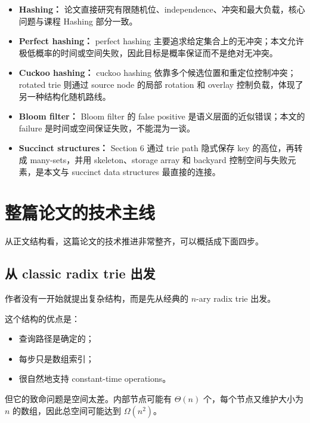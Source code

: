 \documentclass[12pt]{article}
\begin{document}
\begin{itemize}
\item \textbf{Hashing：} 论文直接研究有限随机位、independence、冲突和最大负载，核心问题与课程 Hashing 部分一致。
\item \textbf{Perfect hashing：} perfect hashing 主要追求给定集合上的无冲突；本文允许极低概率的时间或空间失败，因此目标是概率保证而不是绝对无冲突。
\item \textbf{Cuckoo hashing：} cuckoo hashing 依靠多个候选位置和重定位控制冲突；rotated trie 则通过 source node 的局部 rotation 和 overlay 控制负载，体现了另一种结构化随机路线。
\item \textbf{Bloom filter：} Bloom filter 的 false positive 是语义层面的近似错误；本文的 failure 是时间或空间保证失败，不能混为一谈。
\item \textbf{Succinct structures：} Section 6 通过 trie path 隐式保存 key 的高位，再转成 many-sets，并用 skeleton、storage array 和 backyard 控制空间与失败元素，是本文与 succinct data structures 最直接的连接。
\end{itemize}

\section{整篇论文的技术主线}

从正文结构看，这篇论文的技术推进非常整齐，可以概括成下面四步。

\subsection{从 classic radix trie 出发}

作者没有一开始就提出复杂结构，而是先从经典的 \(n\)-ary radix trie 出发。

这个结构的优点是：

\begin{itemize}

\item 查询路径是确定的；

\item 每步只是数组索引；

\item 很自然地支持 constant-time operations。

\end{itemize}

但它的致命问题是空间太差。内部节点可能有 \(\Theta(n)\) 个，每个节点又维护大小为 \(n\) 的数组，因此总空间可能达到 \(\Omega(n^2)\)\cite[Sec.~3]{kuszmaul2022}。
\end{document}
